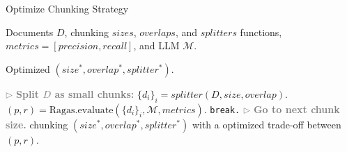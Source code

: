 \begin{algorithm}[t]
\caption{Optimize Chunking Strategy}\label{alg:chunkopt}
\begin{algorithmic}[1]
\REQUIRE
Documents $D$, chunking $sizes$, $overlaps$, and $splitters$ functions, $metrics=[precision, recall]$, and LLM $\mathcal{M}$.

\ENSURE
Optimized $(size^*, overlap^*, splitter^*)$.

\STATE
\textcolor{gray}{$\triangleright$ \textbf{Split $D$ as small chunks:}}
\STATE
$\{d_i\}_i = splitter(D, size, overlap)$.
\STATE
$(p, r) = \text{Ragas.evaluate}(\{d_i\}_i, \mathcal{M}, metrics)$.
\ELSE
\STATE
\texttt{break.} \textcolor{gray}{$\triangleright$ \textbf{Go to next chunk size.}}
\ENDIF
\ENDFOR
\ENDFOR
\ENDFOR
\RETURN
chunking $(size^*, overlap^*, splitter^*)$ with a optimized trade-off between $(p, r)$.
\end{algorithmic}
\end{algorithm}